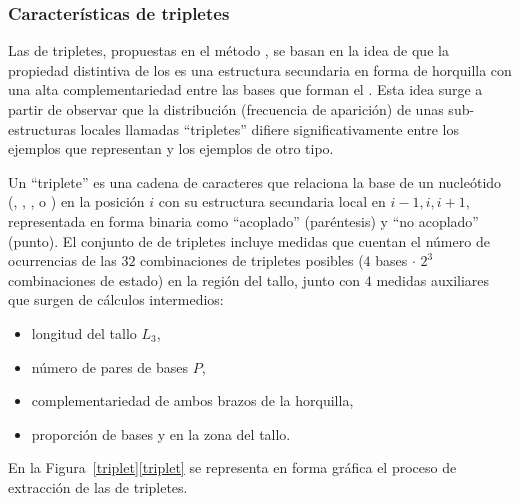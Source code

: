 %
%
\subsubsection{Características de tripletes}
%
Las  de tripletes, propuestas en el método 
\cite{xue}, se basan en la idea de que la propiedad distintiva de los
 es una estructura secundaria en forma de horquilla
con una alta complementariedad entre las bases que forman el .
Esta idea surge a partir de observar que la distribución
(frecuencia de aparición) de unas sub-estructuras locales llamadas
``tripletes'' difiere significativamente entre los ejemplos que
representan  y los ejemplos de otro tipo.


Un ``triplete'' es una cadena de caracteres que relaciona la base de
un nucleótido (\ntA, \ntC, \ntG, o \ntU) en la posición $i$ con su
estructura secundaria local en $i-1,i,i+1$, representada en forma
binaria como ``acoplado'' \pairL (paréntesis) y ``no acoplado''
\noPair (punto).
El conjunto de  de tripletes incluye medidas que cuentan
el número de ocurrencias de las $32$ combinaciones de tripletes posibles
($4$ bases $\cdot$ $2^3$ combinaciones de estado)
en la región del tallo, junto con $4$ medidas auxiliares que surgen
de cálculos intermedios:
%
\begin{itemize}
\item longitud del tallo $L_3$,
\item número de pares de bases $P$,
\item complementariedad de ambos brazos de la horquilla,
\item proporción de bases \ntG y \ntC en la zona del tallo.
\end{itemize}
%
En la \iflatexml{}Figura~\ref{triplet}\else\autoref{triplet}\fi{} se
representa en forma gráfica el proceso de extracción de las 
de tripletes.

